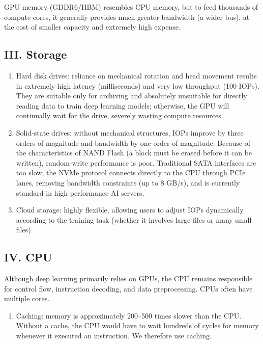 GPU memory (GDDR6/HBM) resembles CPU memory, but to feed thousands of compute cores, it generally provides much greater bandwidth (a wider bus), at the cost of smaller capacity and extremely high expense.

\hypertarget{iii.-storage}{%
\subsection{III. Storage}\label{iii.-storage}}

\begin{enumerate}
\def\labelenumi{\arabic{enumi}.}
\item
  Hard disk drives: reliance on mechanical rotation and head movement results in extremely high latency (milliseconds) and very low throughput (100 IOPs). They are suitable only for archiving and absolutely unsuitable for directly reading data to train deep learning models; otherwise, the GPU will continually wait for the drive, severely wasting compute resources.
\item
  Solid-state drives: without mechanical structures, IOPs improve by three orders of magnitude and bandwidth by one order of magnitude. Because of the characteristics of NAND Flash (a block must be erased before it can be written), random-write performance is poor. Traditional SATA interfaces are too slow; the NVMe protocol connects directly to the CPU through PCIe lanes, removing bandwidth constraints (up to 8 GB/s), and is currently standard in high-performance AI servers.
\item
  Cloud storage: highly flexible, allowing users to adjust IOPs dynamically according to the training task (whether it involves large files or many small files).
\end{enumerate}

\hypertarget{iv.-cpu}{%
\subsection{IV. CPU}\label{iv.-cpu}}

Although deep learning primarily relies on GPUs, the CPU remains responsible for control flow, instruction decoding, and data preprocessing. CPUs often have multiple cores.

\begin{enumerate}
\def\labelenumi{\arabic{enumi}.}
\tightlist
\item
  Caching: memory is approximately 200--500 times slower than the CPU. Without a cache, the CPU would have to wait hundreds of cycles for memory whenever it executed an instruction. We therefore use caching.
\end{enumerate}

